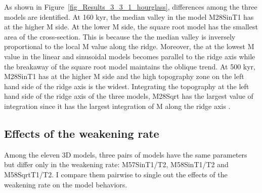 As shown in Figure~\hyperref[fig_Results_3_3_1_hourglass]{\ref{fig_Results_3_3_1_hourglass}}, differences among the three models are identified. At 160 kyr, the median valley in the model M28SinT1 has  at the higher M side.  At the lower M side, the square root model has the smallest area of the cross-section. This is because the  the median valley is inversely proportional to the local M value along the ridge. Moreover, the  at the lowest M value in the linear and sinusoidal models becomes parallel to the ridge axis while the breakaway of the square root model maintains the oblique trend.  At 500 kyr, M28SinT1 has  at the higher M side and the high topography zone on the left hand side of the ridge axis is the widest. Integrating the topography at the left hand side of the ridge axis of the three models, M28Sqrt has the largest value of integration since it has the largest integration of M along the ridge axis .

\subsection{Effects of the weakening rate}

Among the eleven 3D models, three pairs of models have the same parameters but differ only in the weakening rate: M57SinT1/T2, M58SinT1/T2 and M58SqrtT1/T2. I compare them pairwise to single out the effects of the weakening rate on the model behaviors.


